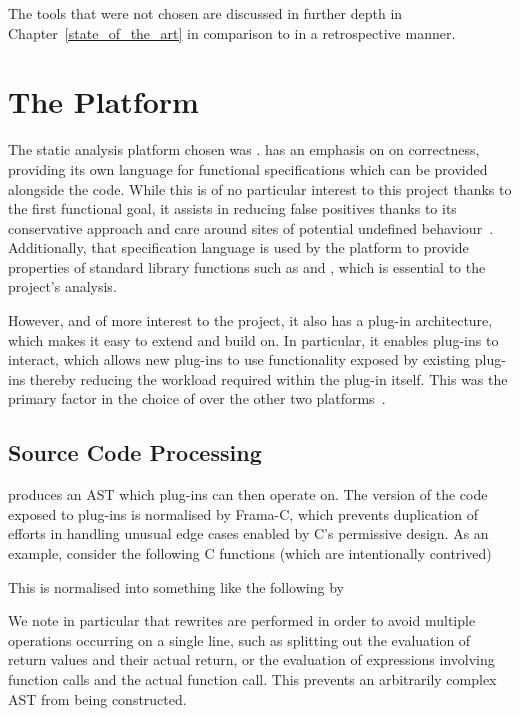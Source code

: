 The tools that were not chosen are discussed in further depth in Chapter~\ref{state_of_the_art} in comparison to  in a retrospective manner.

\section{The  Platform}

The static analysis platform chosen was .  has an emphasis on on correctness, providing its own language for functional specifications which can be provided alongside the code. While this is of no particular interest to this project thanks to the first functional goal, it assists in reducing false positives thanks to its conservative approach and care around sites of potential undefined behaviour~\cite{framauser}. Additionally, that specification language is used by the platform to provide properties of standard library functions such as \malloc{} and \free{}, which is essential to the project's analysis.

However, and of more interest to the project, it also has a plug-in architecture, which makes it easy to extend and build on. In particular, it enables plug-ins to interact, which allows new plug-ins to use functionality exposed by existing plug-ins thereby reducing the workload required within the plug-in itself. This was the primary factor in the choice of  over the other two platforms~\cite{framaarch}.

\subsection{Source Code Processing}

 produces an AST which plug-ins can then operate on. The version of the code exposed to plug-ins is normalised by Frama-C, which prevents duplication of efforts in handling unusual edge cases enabled by C's permissive design. As an example, consider the following C functions (which are intentionally contrived)



This is normalised into something like the following by 



We note in particular that rewrites are performed in order to avoid multiple operations occurring on a single line, such as splitting out the evaluation of return values and their actual return, or the evaluation of expressions involving function calls and the actual function call. This prevents an arbitrarily complex AST from being constructed.

